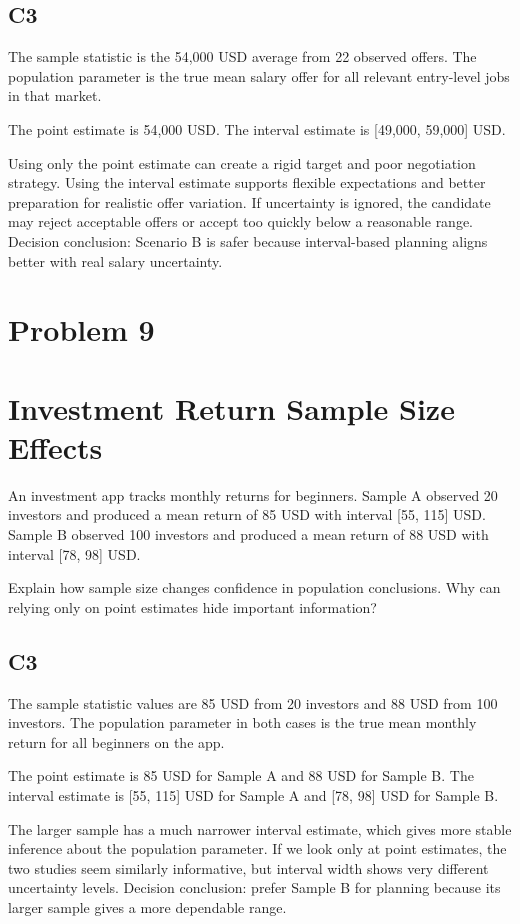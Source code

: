 \begin{ExamProblems}
		\subsection*{C3}
		The sample statistic is the 54,000 USD average from 22 observed offers.
		The population parameter is the true mean salary offer for all relevant entry-level jobs in that market.

		The point estimate is 54,000 USD.
		The interval estimate is [49,000, 59,000] USD.

		Using only the point estimate can create a rigid target and poor negotiation strategy.
		Using the interval estimate supports flexible expectations and better preparation for realistic offer variation.
		If uncertainty is ignored, the candidate may reject acceptable offers or accept too quickly below a reasonable range.
		Decision conclusion: Scenario B is safer because interval-based planning aligns better with real salary uncertainty.

		\newpage
		\item
		\section{Problem 9}
		\section{Investment Return Sample Size Effects}
		An investment app tracks monthly returns for beginners.
		Sample A observed 20 investors and produced a mean return of 85 USD with interval [55, 115] USD.
		Sample B observed 100 investors and produced a mean return of 88 USD with interval [78, 98] USD.

		Explain how sample size changes confidence in population conclusions.
		Why can relying only on point estimates hide important information?

		\subsection*{C3}
		The sample statistic values are 85 USD from 20 investors and 88 USD from 100 investors.
		The population parameter in both cases is the true mean monthly return for all beginners on the app.

		The point estimate is 85 USD for Sample A and 88 USD for Sample B.
		The interval estimate is [55, 115] USD for Sample A and [78, 98] USD for Sample B.

		The larger sample has a much narrower interval estimate, which gives more stable inference about the population parameter.
		If we look only at point estimates, the two studies seem similarly informative, but interval width shows very different uncertainty levels.
		Decision conclusion: prefer Sample B for planning because its larger sample gives a more dependable range.


\end{ExamProblems}
